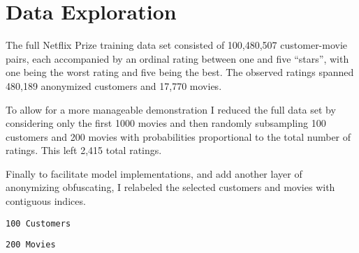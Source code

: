 \documentclass[
  letterpaper,
  DIV=11,
  numbers=noendperiod]{scrartcl}
\newenvironment{Shaded}{\begin{snugshade}}{\end{snugshade}}
\newcommand{\FunctionTok}[1]{\textcolor[rgb]{0.28,0.35,0.67}{#1}}
\newcommand{\NormalTok}[1]{\textcolor[rgb]{0.00,0.23,0.31}{#1}}
\newcommand{\OtherTok}[1]{\textcolor[rgb]{0.00,0.23,0.31}{#1}}
\newcommand{\SpecialCharTok}[1]{\textcolor[rgb]{0.37,0.37,0.37}{#1}}
\newcommand{\StringTok}[1]{\textcolor[rgb]{0.13,0.47,0.30}{#1}}
\begin{document}
\section{Data Exploration}\label{data-exploration}

The full Netflix Prize training data set consisted of 100,480,507
customer-movie pairs, each accompanied by an ordinal rating between one
and five ``stars'', with one being the worst rating and five being the
best. The observed ratings spanned 480,189 anonymized customers and
17,770 movies.

To allow for a more manageable demonstration I reduced the full data set
by considering only the first 1000 movies and then randomly subsampling
100 customers and 200 movies with probabilities proportional to the
total number of ratings. This left 2,415 total ratings.

Finally to facilitate model implementations, and add another layer of
anonymizing obfuscating, I relabeled the selected customers and movies
with contiguous indices.

\begin{Shaded}
\end{Shaded}

\begin{verbatim}
100 Customers
\end{verbatim}

\begin{Shaded}
\end{Shaded}

\begin{verbatim}
200 Movies
\end{verbatim}

\begin{Shaded}
\end{Shaded}
\end{document}
